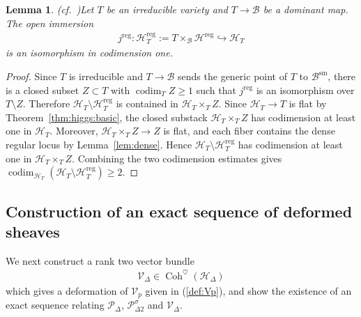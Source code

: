 \documentclass[11pt,oneside,a4paper,mathscr]{amsart}
\newtheorem{lemma}[thm]{Lemma}
\theoremstyle{definition}
\renewcommand{\geq}{\geqslant}
\newcommand{\cH}{\mathcal{H}}
\newcommand{\cB}{\mathcal{B}}
\newcommand{\cP}{\mathcal{P}}
\newcommand{\Coh}{\operatorname{Coh}}
\begin{document}
\begin{lemma}\emph{(cf.~\cite[Lemma~5.7]{TodaGL2})}\label{lem:codimension}
Let $T$ be an irreducible variety and $T\to \cB$ be a dominant map. 
The open immersion 
\begin{align}\label{jreg}
    j^{\mathrm{reg}}\colon \cH^{\mathrm{reg}}_{T}:=T\times_{\cB}\cH^{\mathrm{reg}}
    \hookrightarrow \cH_{T}     
\end{align}
    is an isomorphism in codimension one. 
\end{lemma}
\begin{proof}
Since $T$ is irreducible and $T \to \cB$ sends the generic point of $T$ to $\cB^{\mathrm{sm}}$, 
there is a closed subset $Z\subset T$ with 
$\operatorname{codim}_{T} Z \geq 1$ such that 
$j^{\mathrm{reg}}$ is an isomorphism over $T \setminus Z$. 
Therefore $\cH_{T} \setminus \cH_{T}^{\mathrm{reg}}$ is contained in 
$\cH_{T}\times_{T} Z$. Since $\cH_{T} \to T$ is flat by 
Theorem~\ref{thm:higgs:basic}, the closed substack 
$\cH_{T}\times_{T} Z$ has codimension at least one in 
$\cH_{T}$. Moreover, $\cH_{T}\times_{T} Z \to Z$ is flat, and 
each fiber contains the dense regular locus by Lemma~\ref{lem:dense}. Hence 
$\cH_{T} \setminus \cH_{T}^{\mathrm{reg}}$ has codimension at least 
one in $\cH_{T}\times_{T}Z$. Combining the two codimension estimates gives
$\operatorname{codim}_{\cH_{T}}
(\cH_{T} \setminus \cH_{T}^{\mathrm{reg}})\geq 2$.
\end{proof}






\subsection{Construction of an exact sequence of deformed sheaves}
We next construct a rank two vector bundle 
\begin{align*}
    \mathcal{V}_{\Delta} \in \Coh^{\heartsuit}(\cH_{\Delta})
\end{align*}
which gives a deformation of $\mathcal{V}_p$ given in (\ref{def:Vp}), and 
show the existence of an exact sequence 
relating $\cP_{\Delta}$, $\cP_{\Delta 2}^{\sigma}$ and $\mathcal{V}_{\Delta}$. 
\end{document}
